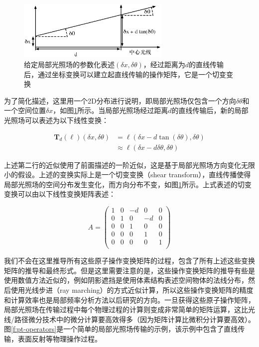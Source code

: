 \begin{figure}
\sidecaption
	\includegraphics[width=0.65\textwidth]{figures/pt/travel}
	\caption{给定局部光照场的参数化表述$(\delta x,\delta\theta)$，经过距离为$d$的直线传输后，通过坐标变换可以建立起直线传输的操作矩阵，它是一个切变变换}
	\label{f:pt-travel}
\end{figure}

为了简化描述，这里用一个2D分布进行说明，即局部光照场仅包含一个方向$\delta\theta$和一个空间位置$\delta x$，如图\ref{f:pt-travel}所示。当局部光照场经过距离$d$的直线传输后，新的局部光照场可以表述为以下线性变换：

\begin{equation}
	\begin{aligned}
		\mathbf{T}_d(\ell)(\delta x,\delta\theta)&=\ell(\delta x-d\tan{(\delta\theta)},\delta\theta)\\
		&\approx\ell(\delta x-d\delta\theta,\delta\theta)
	\end{aligned}
\end{equation}

\noindent 上述第二行的近似使用了前面描述的一阶近似，这是基于局部光照场方向变化无限小的假设。上述的变换实际上是一个切变变换（shear transform），直线传播使得局部光照场的空间分布发生变化，而方向分布不变，如图\ref{f:pt-travel}所示。上式表述的切变变换可以由以下线性变换矩阵表述：

\begin{equation}
	A=\begin{pmatrix}
		1 & 0 & -d & 0 & 0 \\
		0 & 1 & 0 & -d & 0 \\
		0 & 0 & 1 & 0 & 0 \\
		0 & 0 & 0 & 1 & 0 \\
		0 & 0 & 0 & 0 & 1 \\
	\end{pmatrix}
\end{equation}

我们不会在这里推导所有这些原子操作变换矩阵的过程，\cite{a:AFrequencyAnalysisofLightTransportfromtheorytoimplementation}包含了所有上述这些变换矩阵的推导和最终形式。但是这里需要注意的是，这些操作变换矩阵的推导有些是使用数值方法近似的，例如阴影遮挡是使用体素结构表述空间物体的法线分布，然后使用光线步进（ray marching）的方式近似计算，所以这些操作变换矩阵的精度和计算效率也是局部频率分析方法以后研究的方向。一旦获得这些原子操作矩阵，局部光照场在传输过程中每个物理过程的计算则变成非常简单的矩阵运算，这比光线/路径微分技术中的微分计算要高效得多（因为矩阵计算比微积分计算要高效）。图\ref{f:pt-operators}是一个简单的局部光照场传输的示例，该示例中包含了直线传输，表面反射等物理操作过程。

